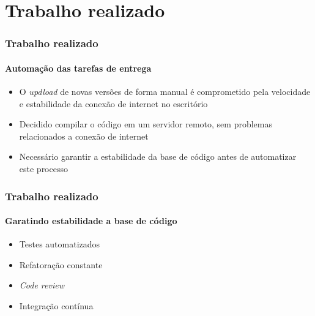 \documentclass[aspectratio=169]{beamer}
\begin{document}
\section{Trabalho realizado}

\begin{frame}
	\frametitle{Trabalho realizado}
	\framesubtitle{Automação das tarefas de entrega}
	
	\begin{itemize}
		 \item O \textit{updload} de novas versões de forma manual é comprometido pela velocidade e estabilidade da conexão de internet no escritório

		 \item Decidido compilar o código em um servidor remoto, sem problemas relacionados a conexão de internet
		 
		 \item Necessário garantir a estabilidade da base de código antes de automatizar este processo
	\end{itemize}

\end{frame}

\begin{frame}
	\frametitle{Trabalho realizado}
	\framesubtitle{Garatindo estabilidade a base de código}
	
	\begin{itemize}
		
		\item Testes automatizados
		
		\item Refatoração constante
		
		\item \textit{Code review}
	
		\item Integração contínua
		
	\end{itemize}
	
\end{frame}
\end{document}
